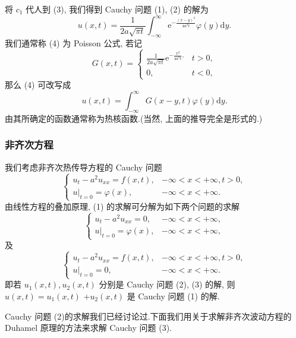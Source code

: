 将 $c_1$ 代人到 (3), 我们得到 Cauchy 问题 (1), (2) 的解为
\begin{equation*}
    u(x, t)=\frac{1}{2 a \sqrt{\pi t}} \int_{-\infty}^{\infty} \mathrm{e}^{-\frac{( x-y)^{2}}{4 a^{2} t}} \varphi(y) \mathrm{d} y .\tag{4}
\end{equation*}
我们通常称 (4) 为 Poisson 公式, 若记
$$
G(x, t)=\left\{\begin{array}{ll}
\frac{1}{2 a \sqrt{\pi t}} \mathrm{e}^{-\frac{x^{2}}{4 a^{2} t},} & t>0, \\
0, & t<0,
\end{array}\right.
$$
那么 (4) 可改写成
$$
u(x, t)=\int_{-\infty}^{\infty} G(x-y, t) \varphi(y) \mathrm{d} y .
$$
由其所确定的函数通常称为热核函数.(当然, 上面的推导完全是形式的.)

\subsubsection{非齐次方程}

我们考虑非齐次热传导方程的 Cauchy 问题
\begin{equation*}
    \left\{\begin{array}{ll}
u_{t}-a^{2} u_{x x}=f(x, t), & -\infty<x<+\infty, t>0, \\
\left.u\right|_{t=0}=\varphi(x), & -\infty<x<+\infty .
\end{array}\right.\tag{1}
\end{equation*}
由线性方程的叠加原理, (1) 的求解可分解为如下两个问题的求解
\begin{equation*}
\left\{\begin{array}{ll}
u_{t}-a^{2} u_{x x}=0, & -\infty<x<+\infty, \\
\left.u\right|_{t=0}=\varphi(x), & -\infty<x<+\infty,
\end{array}\right.\tag{2}
\end{equation*}
及
\begin{equation*}
\left\{\begin{array}{ll}
u_{t}-a^{2} u_{x x}=f(x, t), & -\infty<x<+\infty, t>0, \\
\left.u\right|_{t=0}=0, & -\infty<x<+\infty .
\end{array}\right.\tag{3}
\end{equation*}
即若 $ u_{1}(x, t), u_{2}(x, t) $ 分别是 Cauchy 问题 (2), (3) 的解, 则 $ u(x, t)=u_{1}(x, t) $ $ +u_{2}(x, t) $ 是 Cauchy 问题 (1) 的解.

Cauchy 问题 (2)的求解我们已经讨论过.下面我们用关于求解非齐次波动方程的 Duhamel 原理的方法来求解 Cauchy 问题 (3).

